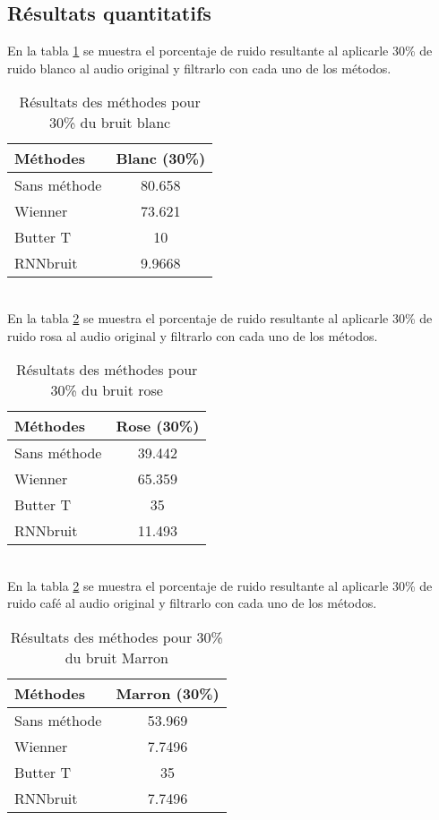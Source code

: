 \documentclass[conference,onecolumn]{IEEEtran}
\begin{document}
\subsection{Résultats quantitatifs}
En la tabla \ref{table:t1} se muestra el porcentaje de ruido
resultante al aplicarle 30\% de ruido blanco al audio original y
filtrarlo con cada uno de los métodos.  
\begin{table}[hbt!]
    \centering
    \begin{tabular}{ l  c }
    \textbf{Méthodes} & \textbf{Blanc (30\%)} \\
    \hline
    Sans méthode & 80.658 \\
    Wienner & 73.621 \\
    Butter T & 10 \\
    RNNbruit & 9.9668 \\
    \end{tabular}
    \caption{Résultats des méthodes pour 30\% du bruit blanc}
    \label{table:t1}
\end{table}
\hfill \\
En la tabla \ref{table:t2} se muestra el porcentaje de ruido resultante al aplicarle 30\% de ruido rosa al audio original y filtrarlo con cada uno de los métodos.  
\begin{table}[hbt!]
    \centering
    \begin{tabular}{ l  c }
    \textbf{Méthodes} & \textbf{Rose (30\%)} \\
    \hline
    Sans méthode & 39.442 \\
    Wienner & 65.359 \\
    Butter T & 35 \\
    RNNbruit & 11.493 \\
    \end{tabular}
    \caption{Résultats des méthodes pour 30\% du bruit rose}
    \label{table:t2}
\end{table}
\hfill \\
En la tabla \ref{table:t2} se muestra el porcentaje de ruido resultante al aplicarle 30\% de ruido café al audio original y filtrarlo con cada uno de los métodos. 
\begin{table}[hbt!]
    \centering
    \begin{tabular}{ l  c }
    \textbf{Méthodes} & \textbf{Marron (30\%)} \\
    \hline
    Sans méthode & 53.969 \\
    Wienner & 7.7496 \\
    Butter T & 35 \\
    RNNbruit & 7.7496 \\
    \end{tabular}
    \caption{Résultats des méthodes pour 30\% du bruit Marron}
    \label{table:t3}
\end{table}
\end{document}
